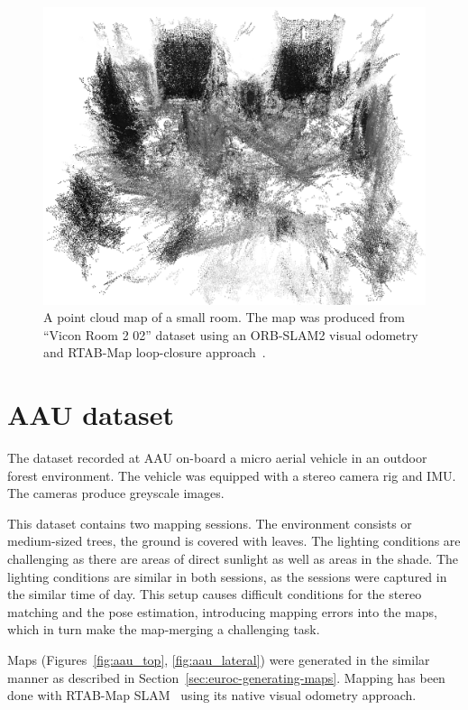 \begin{figure}
    \centering
    \includegraphics[width=\textwidth]{../img/euroc_v2_02.png}
    \caption[Point cloud map of a small room]{A point cloud map of a small room. The map was produced from ``Vicon Room 2 02'' dataset using an {ORB-SLAM2} visual odometry~\citep{mur2017orb} and RTAB-Map loop-closure approach~\citep{labbe2014online}.}
    \label{fig:euroc_v2_02}
\end{figure}

\section{AAU dataset}
\label{sec:aau-dataset}

The dataset recorded at \acrfull{AAU} on-board a micro aerial vehicle in an outdoor forest environment. The vehicle was equipped with a stereo camera rig and \gls{IMU}. The cameras produce greyscale images.

This dataset contains two mapping sessions. The environment consists or medium-sized trees, the ground is covered with leaves. The lighting conditions are challenging as there are areas of direct sunlight as well as areas in the shade. The lighting conditions are similar in both sessions, as the sessions were captured in the similar time of day. This setup causes difficult conditions for the stereo matching and the pose estimation, introducing mapping errors into the maps, which in turn make the map-merging a challenging task.

Maps (Figures~\ref{fig:aau_top}, \ref{fig:aau_lateral}) were generated in the similar manner as described in Section~\ref{sec:euroc-generating-maps}. Mapping has been done with RTAB-Map \gls{SLAM}~\citep{labbe2014online} using its native visual odometry approach.

